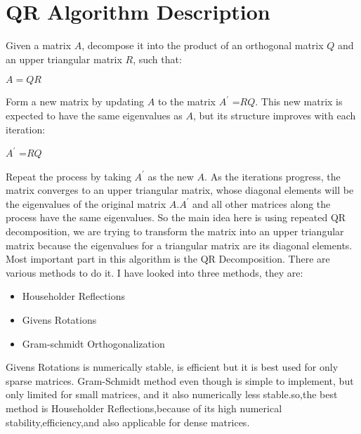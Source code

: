 \documentclass[journal]{IEEEtran}
\begin{document}
\section*{QR Algorithm Description}
Given a matrix $ A $, decompose it into the product of an orthogonal matrix $ Q $ and an upper triangular matrix $ R $, such that:
\begin{center}
    $A = QR$
\end{center}
Form a new matrix by updating $A$ to the matrix $ A^\prime$ =$ RQ $. This new matrix is expected to have the same eigenvalues as $A $, but its structure improves with each iteration:
\begin{center}
    $A^\prime$ =$ RQ$
\end{center}
Repeat the process by taking  $A^\prime$ as the new $A $. As the iterations progress, the matrix converges to an upper triangular matrix, whose diagonal elements will be the eigenvalues of the original matrix $ A $.$A^\prime$ and all other matrices along the process have the same eigenvalues. So the main idea here is using
repeated QR decomposition, we are trying to transform the matrix into an upper triangular matrix because the
eigenvalues for a triangular matrix are its diagonal elements.\\
Most important part in this algorithm is the QR Decomposition. There are various methods to do it. I have
looked into three methods, they are:
\begin{itemize}
    \item Householder Reflections
    \item Givens Rotations
    \item Gram-schmidt Orthogonalization
\end{itemize}
Givens Rotations is numerically stable, is efficient but it is best used for only sparse matrices. Gram-Schmidt method even though is simple to implement, but only limited for small matrices, and it also
numerically less stable.so,the best method is Householder Reflections,because of its high numerical stability,efficiency,and also applicable for dense matrices.
\end{document}
